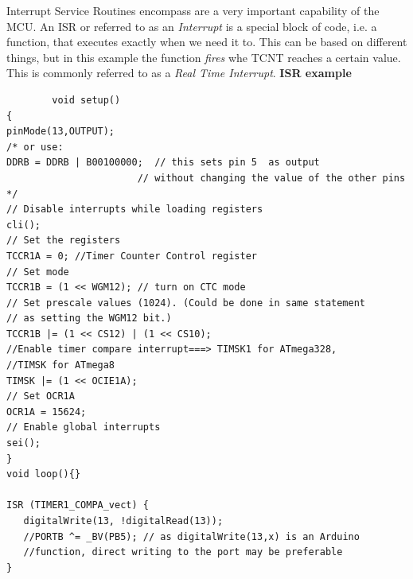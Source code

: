 \documentclass[11pt]{article}
\begin{document}
\begin{description}
		\newpage
		Interrupt Service Routines encompass are a very important capability of the MCU. An ISR or referred to as an {\it Interrupt} is a special block of code, i.e. a function, that executes exactly when we need it to. This can be based on different things, but in this example the function {\it fires} whe TCNT reaches a certain value. This is commonly referred to as a {\it Real Time Interrupt}.
		\textbf{ISR example}
		\begin{verbatim}
		void setup()
{     
pinMode(13,OUTPUT);
/* or use:
DDRB = DDRB | B00100000;  // this sets pin 5  as output
                       // without changing the value of the other pins 
*/
// Disable interrupts while loading registers
cli();
// Set the registers
TCCR1A = 0; //Timer Counter Control register
// Set mode
TCCR1B = (1 << WGM12); // turn on CTC mode
// Set prescale values (1024). (Could be done in same statement
// as setting the WGM12 bit.)
TCCR1B |= (1 << CS12) | (1 << CS10);
//Enable timer compare interrupt===> TIMSK1 for ATmega328, 
//TIMSK for ATmega8
TIMSK |= (1 << OCIE1A);
// Set OCR1A
OCR1A = 15624;
// Enable global interrupts
sei();
}
void loop(){}

ISR (TIMER1_COMPA_vect) {
   digitalWrite(13, !digitalRead(13));
   //PORTB ^= _BV(PB5); // as digitalWrite(13,x) is an Arduino 
   //function, direct writing to the port may be preferable
}
		\end{verbatim}
		
		
    \end{description}
\end{document}
